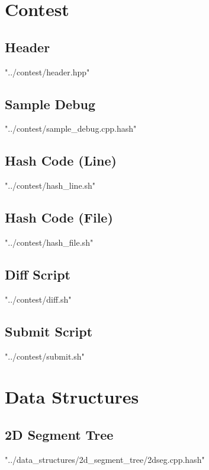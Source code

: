 \documentclass [12pt,onecolumn,oneside]{article}
\begin{document}
\pagestyle{fancy}
\fancyfoot{}
\fancyhead[R]{\thepage}
\renewcommand{\headrulewidth}{0.4pt}
\tableofcontents
\scriptsize

\newpage
\section{Contest}
\subsection{ Header}
 {"../contest/header.hpp"}
\newpage

\subsection{ Sample Debug}
 {"../contest/sample_debug.cpp.hash"}
\newpage

\subsection{ Hash Code (Line)}
 {"../contest/hash_line.sh"}

\subsection{ Hash Code (File)}
 {"../contest/hash_file.sh"}

\subsection{ Diff Script}
 {"../contest/diff.sh"}

\subsection{ Submit Script}
 {"../contest/submit.sh"}
\newpage

\section{Data Structures}
\subsection{ 2D Segment Tree}
 {"../data_structures/2d_segment_tree/2dseg.cpp.hash"}
\newpage
\end{document}
